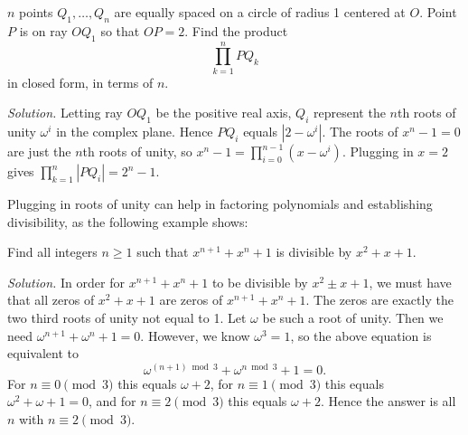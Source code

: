 \begin{ex}
$n$ points $Q_1,\ldots, Q_n$ are equally spaced on a circle of radius 1 centered at $O$. Point $P$ is on ray $OQ_1$ so that $OP=2$. Find the product
\[\prod_{k=1}^n PQ_k\]
in closed form, in terms of $n$.
\end{ex}
\noindent \textit{Solution.} Letting ray $OQ_1$ be the positive real axis, $Q_i$ represent the $n$th roots of unity $\omega^i$ in the complex plane. Hence $PQ_i$ equals $|2-\omega^i|$. The roots of $x^n-1=0$ are just the $n$th roots of unity, so $x^n-1=\prod_{i=0}^{n-1} (x-\omega^i)$. Plugging in $x=2$ gives $\prod_{k=1}^n |PQ_i|=2^n-1$.

Plugging in roots of unity can help in factoring polynomials and establishing divisibility, as the following example shows:
\begin{ex}
Find all integers $n\geq 1$ such that $x^{n+1}+x^n+1$ is divisible by $x^2+ x+1$.
\end{ex}
\noindent \textit{Solution.} 
In order for $x^{n+1}+x^n+1$ to be divisible by $x^2\pm x+1$, we must have that all zeros of $x^2+x+1$ are zeros of $x^{n+1}+x^n+1$. The zeros are exactly the two third roots of unity not equal to 1. Let $\omega$ be such a root of unity. Then we need $\omega^{n+1}+\omega^n+1=0$. However, we know $\omega^3=1$, so the above equation is equivalent to
\[\omega^{(n+1)\bmod 3}+\omega^{n\bmod 3}+1=0.\]
For $n\equiv 0\pmod 3$ this equals $\omega+2$, for $n\equiv 1\pmod 3$ this equals $\omega^2+\omega+1=0$, and for $n\equiv 2\pmod 3$ this equals $\omega+2$. Hence the answer is all $n$ with $n\equiv 2\pmod 3$.

